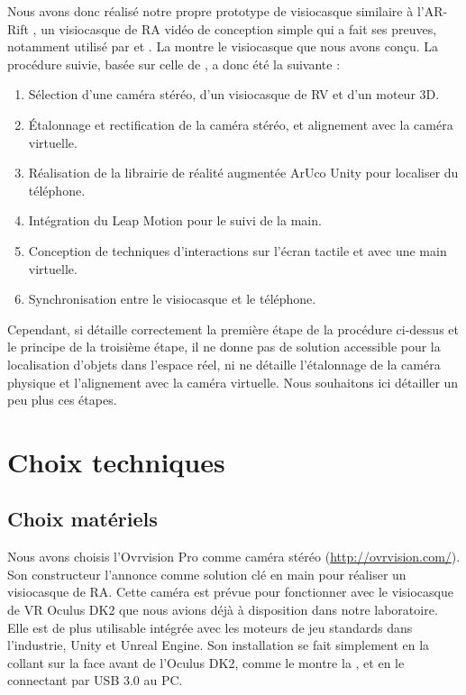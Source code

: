 Nous avons donc réalisé notre propre prototype de visiocasque similaire à l'AR-Rift \citep{Steptoe2013}, un visiocasque de RA vidéo de conception simple qui a fait ses preuves, notamment utilisé par \cite{Steptoe2014} et \cite{Piumsomboon2014}. La  montre le visiocasque que nous avons conçu. La procédure suivie, basée sur celle de \cite{Steptoe2013}, a donc été la suivante :
\begin{enumerate}
  \item Sélection d'une caméra stéréo, d'un visiocasque de RV et d'un moteur 3D.
  \item Étalonnage et rectification de la caméra stéréo, et alignement avec la caméra virtuelle.
  \item Réalisation de la librairie de réalité augmentée ArUco Unity pour localiser du téléphone.
  \item Intégration du Leap Motion pour le suivi de la main.
  \item Conception de techniques d'interactions sur l'écran tactile et avec une main virtuelle.
  \item Synchronisation entre le visiocasque et le téléphone.
\end{enumerate}

Cependant, si \cite{Steptoe2013} détaille correctement la première étape de la procédure ci-dessus et le principe de la troisième étape, il ne donne pas de solution accessible pour la localisation d'objets dans l'espace réel, ni ne détaille l'étalonnage de la caméra physique et l'alignement avec la caméra virtuelle. Nous souhaitons ici détailler un peu plus ces étapes.



\section{Choix techniques}
\label{sec:technical_choices}

\subsection{Choix matériels}
Nous avons choisis l'Ovrvision Pro comme caméra stéréo (\url{http://ovrvision.com/}). Son constructeur l'annonce comme solution clé en main pour réaliser un visiocasque de RA. Cette caméra est prévue pour fonctionner avec le visiocasque de VR Oculus DK2 que nous avions déjà à disposition dans notre laboratoire. Elle est de plus utilisable intégrée avec les moteurs de jeu standards dans l'industrie, Unity et Unreal Engine. Son installation se fait simplement en la collant sur la face avant de l'Oculus DK2, comme le montre la , et en le connectant par USB 3.0 au PC.

